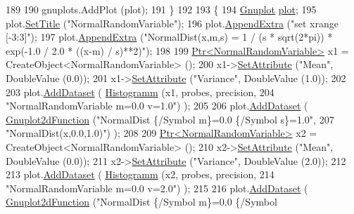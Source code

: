 \begin{DoxyCode}
189 
190     gnuplots.AddPlot (plot);
191   \}
192 
193   \{
194     \hyperlink{classns3_1_1Gnuplot}{Gnuplot} \hyperlink{lte__amc_8m_a5942306abe9f005572e4344e3cdef528}{plot};
195     plot.\hyperlink{classns3_1_1Gnuplot_ac01f15633d49f0239f8a45293a1e04f0}{SetTitle} (\textcolor{stringliteral}{"NormalRandomVariable"});
196     plot.\hyperlink{classns3_1_1Gnuplot_a649a3041b9d0ea21a212b5ad9b28ecbf}{AppendExtra} (\textcolor{stringliteral}{"set xrange [-3:3]"});
197     plot.\hyperlink{classns3_1_1Gnuplot_a649a3041b9d0ea21a212b5ad9b28ecbf}{AppendExtra} (\textcolor{stringliteral}{"NormalDist(x,m,s) = 1 / (s * sqrt(2*pi)) * exp(-1.0 / 2.0 * ((x-m) /
       s)**2)"});
198 
199     \hyperlink{classns3_1_1Ptr}{Ptr<NormalRandomVariable>} x1 = CreateObject<NormalRandomVariable> ();
200     x1->\hyperlink{classns3_1_1ObjectBase_ac60245d3ea4123bbc9b1d391f1f6592f}{SetAttribute} (\textcolor{stringliteral}{"Mean"}, DoubleValue (0.0));
201     x1->\hyperlink{classns3_1_1ObjectBase_ac60245d3ea4123bbc9b1d391f1f6592f}{SetAttribute} (\textcolor{stringliteral}{"Variance"}, DoubleValue (1.0));
202 
203     plot.\hyperlink{classns3_1_1Gnuplot_a306ec724a327cf9ab699700f31fca0a1}{AddDataset} ( \hyperlink{main-random-variable_8cc_a2cfd3837ab3f2e816cf53486d7a186b5}{Histogramm} (x1, probes, precision,
204                                   \textcolor{stringliteral}{"NormalRandomVariable m=0.0 v=1.0"}) );
205 
206     plot.\hyperlink{classns3_1_1Gnuplot_a306ec724a327cf9ab699700f31fca0a1}{AddDataset} ( \hyperlink{classns3_1_1Gnuplot2dFunction}{Gnuplot2dFunction} (\textcolor{stringliteral}{"NormalDist \{/Symbol m\}=0.0 \{/Symbol
       s\}=1.0"},
207                                          \textcolor{stringliteral}{"NormalDist(x,0.0,1.0)"}) );
208 
209     \hyperlink{classns3_1_1Ptr}{Ptr<NormalRandomVariable>} x2 = CreateObject<NormalRandomVariable> ();
210     x2->\hyperlink{classns3_1_1ObjectBase_ac60245d3ea4123bbc9b1d391f1f6592f}{SetAttribute} (\textcolor{stringliteral}{"Mean"}, DoubleValue (0.0));
211     x2->\hyperlink{classns3_1_1ObjectBase_ac60245d3ea4123bbc9b1d391f1f6592f}{SetAttribute} (\textcolor{stringliteral}{"Variance"}, DoubleValue (2.0));
212 
213     plot.\hyperlink{classns3_1_1Gnuplot_a306ec724a327cf9ab699700f31fca0a1}{AddDataset} ( \hyperlink{main-random-variable_8cc_a2cfd3837ab3f2e816cf53486d7a186b5}{Histogramm} (x2, probes, precision,
214                                   \textcolor{stringliteral}{"NormalRandomVariable m=0.0 v=2.0"}) );
215 
216     plot.\hyperlink{classns3_1_1Gnuplot_a306ec724a327cf9ab699700f31fca0a1}{AddDataset} ( \hyperlink{classns3_1_1Gnuplot2dFunction}{Gnuplot2dFunction} (\textcolor{stringliteral}{"NormalDist \{/Symbol m\}=0.0 \{/Symbol
}
\end{DoxyCode}
